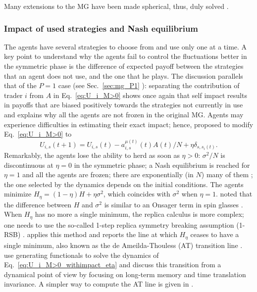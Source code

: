 \documentclass[aps,twocolumn,nofootinbib,sortedaddress,reprint]{revtex4-1}
\begin{document}
Many extensions to the MG have been made spherical, thus, duly solved
\cite{galla2003dynamics,galla2005stationary,galla2005strategy,papadopoulos2008market,bladon2009spherical,demartino2011nonergodic}.

\subsubsection{Impact of used strategies  and Nash equilibrium}

The agents have several strategies to choose from and use only one at
a time.  A key point to understand why the agents fail to control the
fluctuations better in the symmetric phase is the difference of
expected payoff between the strategies that an agent does not use, and
the one that he plays. The discussion parallels that of the $P=1$ case
(see Sec.~\ref{sec:mg_P1} ): separating the contribution of trader
$i$ from $A$ in Eq.\ \eqref{eq:U_i_M>0} shows once again that self
impact results in payoffs that are biased positively towards the
strategies not currently in use and explains why all the agents are
not frozen in the original MG. Agents may experience difficulties in
estimating their exact impact; hence, \textcite{MCZe00} proposed to
modify Eq.\ \eqref{eq:U_i_M>0} to
\begin{equation}\label{eq:U_i_M>0_withimpact_eta}
U_{i,s}(t+1)=U_{i,s}(t)-a_{i,s}^{\mu(t)}(t)A(t)/N+\eta\delta_{s,s_i(t)}.
\end{equation}
Remarkably, the agents lose the ability to herd as soon as $\eta>0$:
$\sigma^2/N$ is discontinuous at $\eta=0$ in the symmetric phase; a
Nash equilibrium is reached for $\eta=1$ and all the agents are
frozen; there are exponentially (in $N$) many of them
\cite{demartino2001replicasymbreaking}; the one selected by the
dynamics depends on the initial conditions. The agents minimize
$H_\eta=(1-\eta)H+\eta\sigma^2$, which coincides with $\sigma^2$ when
$\eta=1$.  \textcite{MCZe00} noted that the difference between $H$ and
$\sigma^2$ is similar to an Onsager term in spin glasses
\cite{MPV}. When $H_\eta$ has no more a single minimum, the replica
calculus is more complex; one needs to use the so-called 1-step
replica symmetry breaking assumption (1-RSB) \cite{MPV}.
\textcite{demartino2001replicasymbreaking} applies this method and reports
the line at which $H_\eta$ ceases to have a single minimum, also
known as the de Ameilda-Thouless (AT) transition line
\cite{AT1978}. \textcite{AdemarHeimel} use generating functionals to solve the dynamics of
Eq.~\eqref{eq:U_i_M>0_withimpact_eta} and discuss this transition from
a dynamical point of view by focusing on long-term memory and time
translation invariance. A simpler way to compute the AT line is given
in \textcite{MGbook}.
\end{document}
